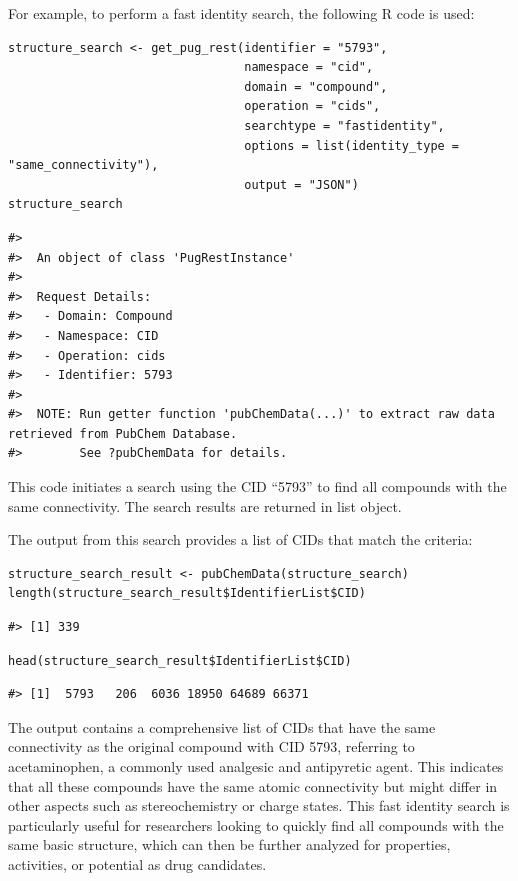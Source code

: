 For example, to perform a fast identity search, the following R code is used:

\begin{verbatim}
structure_search <- get_pug_rest(identifier = "5793", 
                                 namespace = "cid", 
                                 domain = "compound", 
                                 operation = "cids", 
                                 searchtype = "fastidentity", 
                                 options = list(identity_type = "same_connectivity"), 
                                 output = "JSON")
structure_search
\end{verbatim}

\begin{verbatim}
#> 
#>  An object of class 'PugRestInstance'
#> 
#>  Request Details:  
#>   - Domain: Compound
#>   - Namespace: CID
#>   - Operation: cids
#>   - Identifier: 5793
#> 
#>  NOTE: Run getter function 'pubChemData(...)' to extract raw data retrieved from PubChem Database. 
#>        See ?pubChemData for details.
\end{verbatim}

This code initiates a search using the CID ``5793'' to find all compounds with the same connectivity. The search results are returned in list object.

The output from this search provides a list of CIDs that match the criteria:

\begin{verbatim}
structure_search_result <- pubChemData(structure_search)
length(structure_search_result$IdentifierList$CID)
\end{verbatim}

\begin{verbatim}
#> [1] 339
\end{verbatim}

\begin{verbatim}
head(structure_search_result$IdentifierList$CID)
\end{verbatim}

\begin{verbatim}
#> [1]  5793   206  6036 18950 64689 66371
\end{verbatim}

The output contains a comprehensive list of CIDs that have the same connectivity as the original compound with CID 5793, referring to acetaminophen, a commonly used analgesic and antipyretic agent. This indicates that all these compounds have the same atomic connectivity but might differ in other aspects such as stereochemistry or charge states. This fast identity search is particularly useful for researchers looking to quickly find all compounds with the same basic structure, which can then be further analyzed for properties, activities, or potential as drug candidates.

